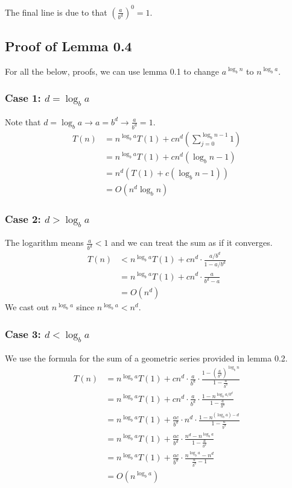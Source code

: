 \documentclass[12pt]{article}
\begin{document}
The final line is due to that $\left(\frac{a}{b^d}\right)^0=1$.

\subsection{Proof of Lemma 0.4}

For all the below, proofs, we can use lemma 0.1
to change $a^{\log_b n}$ to $n^{\log_b a}$.

\subsubsection{Case 1: $d=\log_b a$}

Note that $d=\log_b a \rightarrow a=b^d \rightarrow \frac{a}{b^d}=1$.
\begin{align*}
    T(n)
    &= n^{\log_b a} T(1) + cn^d \left(\sum_{j=0}^{\log_b n - 1} 1\right) \\
    &= n^{\log_b a} T(1)+cn^d\left(\log_b n - 1\right) \\
    &= n^d\left(T(1)+c\left(\log_b n - 1\right)\right) \\
    &= O\left(n^d \log_b n\right)
\end{align*}

\subsubsection{Case 2: $d>\log_b a$}

The logarithm means $\frac{a}{b^d}<1$ and we can treat the sum as if it converges.
\begin{align*}
    T(n)
    &< n^{\log_b a}T(1)+cn^d \cdot \frac{a/b^d}{1-a/b^d} \\
    &= n^{\log_b a}T(1)+cn^d \cdot \frac{a}{b^d-a} \\
    &= O\left(n^d\right)
\end{align*}
We cast out $n^{\log_b a}$ since $n^{\log_b a}<n^d$.

\subsubsection{Case 3: $d<\log_b a$}

We use the formula for the sum of a geometric series provided in lemma 0.2.
\begin{align*}
    T(n)
    &= n^{\log_b a}T(1)+cn^d \cdot \frac{a}{b^d} \cdot \frac{1-\left(\frac{a}{b^d}\right)^{\log_b n}}{1-\frac{a}{b^d}} \\
    &= n^{\log_b a}T(1)+cn^d \cdot \frac{a}{b^d} \cdot \frac{1-n^{\log_b a/b^d}}{1-\frac{a}{b^d}} \\
    &= n^{\log_b a}T(1)+\frac{ac}{b^d} \cdot n^d \cdot \frac{1-n^{(\log_b a) - d}}{1-\frac{a}{b^d}} \\
    &= n^{\log_b a}T(1)+\frac{ac}{b^d} \cdot \frac{n^d-n^{\log_b a}}{1-\frac{a}{b^d}} \\
    &= n^{\log_b a}T(1)+\frac{ac}{b^d} \cdot \frac{n^{\log_b a}-n^d}{\frac{a}{b^d}-1} \\
    &= O\left(n^{\log_b a}\right)
\end{align*}
\end{document}
